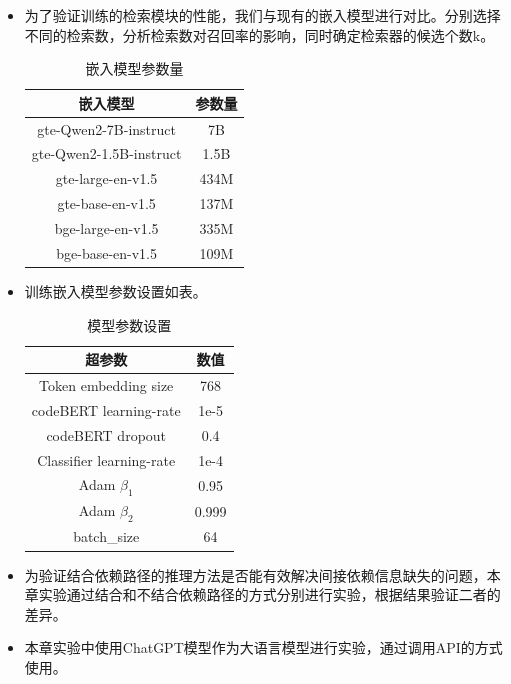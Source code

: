 \begin{itemize}

    \item 为了验证训练的检索模块的性能，我们与现有的嵌入模型进行对比。分别选择不同的检索数，分析检索数对召回率的影响，同时确定检索器的候选个数k。
    
    \begin{table}[htbp]
    \caption{嵌入模型参数量}
    \vspace{0.5em}\centering\wuhao
    \begin{tabular}{cc}
    \toprule
    嵌入模型 & 参数量  \\
    \midrule
    gte-Qwen2-7B-instruct & 7B \\
    gte-Qwen2-1.5B-instruct & 1.5B \\
    gte-large-en-v1.5 & 434M \\
    gte-base-en-v1.5 & 137M \\
    bge-large-en-v1.5 & 335M \\
    bge-base-en-v1.5 & 109M \\
    \bottomrule
    \end{tabular}
    \end{table}
    
    \item 训练嵌入模型参数设置如表。

    \begin{table}[htbp]
    \caption{模型参数设置}
    \vspace{0.5em}\centering\wuhao
    \begin{tabular}{cc}
    \toprule
    超参数 & 数值  \\
    \midrule
    Token embedding size & 768 \\
    codeBERT learning-rate  & 1e-5 \\
    codeBERT dropout & 0.4 \\
    Classifier learning-rate& 1e-4 \\ 
    Adam $\beta_1$  & 0.95  \\
    Adam $\beta_2$ & 0.999  \\
    batch\_size & 64 \\
    \bottomrule
    \end{tabular}
    \end{table}   

    \item 为验证结合依赖路径的推理方法是否能有效解决间接依赖信息缺失的问题，本章实验通过结合和不结合依赖路径的方式分别进行实验，根据结果验证二者的差异。
    
    \item 本章实验中使用ChatGPT模型作为大语言模型进行实验，通过调用API的方式使用。

\end{itemize}

